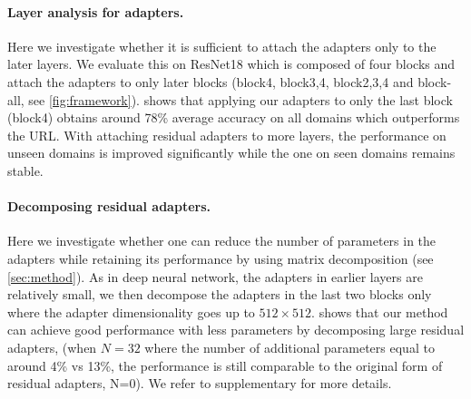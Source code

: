 \paragraph{Layer analysis for adapters.}
Here we investigate whether it is sufficient to attach the adapters only to the later layers.
We evaluate this on ResNet18 which is composed of four blocks and attach the adapters to only later blocks (block4, block3,4, block2,3,4 and block-all, see \cref{fig:framework}). 
 shows that applying our adapters to only the last block (block4) obtains around 78\% average accuracy on all domains which outperforms the URL. With attaching residual adapters to more layers, the performance on unseen domains is improved significantly while the one on seen domains remains stable.



\paragraph{Decomposing residual adapters.}
Here we investigate whether one can reduce the number of parameters in the adapters while retaining its performance by using matrix decomposition (see \cref{sec:method}).
As in deep neural network, the adapters in earlier layers are relatively small, we then decompose the adapters in the last two blocks only where the adapter dimensionality goes up to $512\times 512$.  shows that our method can achieve good performance with less parameters by decomposing large residual adapters, (\eg when $N=32$ where the number of additional parameters equal to around 4\% vs 13\%, the performance is still comparable to the original form of residual adapters, \ie N=0). We refer to supplementary for more details.



